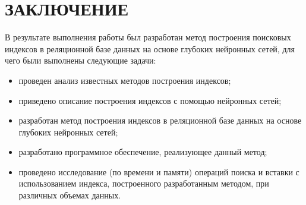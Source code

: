 \chapter*{ЗАКЛЮЧЕНИЕ}


В результате выполнения работы был разработан метод построения поисковых индексов
в реляционной базе данных на основе глубоких нейронных сетей, для чего были
выполнены следующие задачи:

\begin{itemize}
    \item проведен анализ известных методов построения индексов;
    \item приведено описание построения индексов с помощью нейронных сетей;
    \item разработан метод построения индексов в реляционной базе
        данных на основе глубоких нейронных сетей;
    \item разработано программное обеспечение, реализующее данный метод;
    \item проведено исследование (по времени и памяти) операций поиска и вставки
        с использованием индекса, построенного разработанным методом, при
        различных объемах данных.
\end{itemize}
